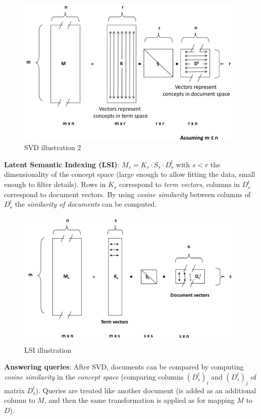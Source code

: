     \begin{figure}[htp]
      \centering
        \includegraphics[width=.7\textwidth]{images/SVD2.png}
        \caption{SVD illustration 2}
        \label{fig:svd2}
    \end{figure}

    \textbf{Latent Semantic Indexing (LSI)}: $M_s = K_s \cdot S_s\cdot D_s^t$ with $s<r$ the dimensionality of the concept space (large enough to allow fitting the data, small enough to filter details). Rows in $K_s$ correspond to \emph{term vectors}, columns in $D_s^t$ correspond to document vectors. By using \emph{cosine similarity} between columns of $D_s^t$ the \emph{similarity of documents} can be computed.

    \begin{figure}[htp]
      \centering
        \includegraphics[width=.7\textwidth]{images/LSI.png}
        \caption{LSI illustration}
        \label{fig:LSI}
    \end{figure}

    \textbf{Answering queries}: After SVD, documents can be compared by computing \emph{cosine similarity} in the \emph{concept space} (comparing columns $(D_s^t)_i$ and $(D_s^t)_j$ of matrix $D_s^t$). Queries are treated like another document (is added as an additional column to $M$, and then the same transformation is applied as for mapping $M$ to $D$).

